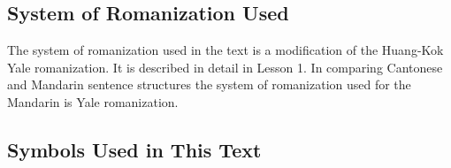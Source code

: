 \subsection{System of Romanization Used}

The system of romanization used in the text is a modification of the Huang-Kok Yale romanization. It is described in detail in Lesson 1. In comparing Cantonese and Mandarin sentence structures the system of romanization used for the Mandarin is Yale romanization.


\subsection{Symbols Used in This Text}

